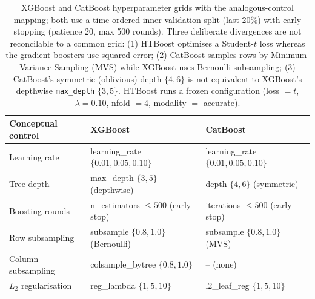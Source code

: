 \begin{table}[htbp]
\centering
\caption{XGBoost and CatBoost hyperparameter grids with the analogous-control mapping; both use a time-ordered inner-validation split (last 20\%) with early stopping (patience 20, max 500 rounds). Three deliberate divergences are not reconcilable to a common grid: (1) HTBoost optimises a Student-$t$ loss whereas the gradient-boosters use squared error; (2) CatBoost samples rows by Minimum-Variance Sampling (MVS) while XGBoost uses Bernoulli subsampling; (3) CatBoost's symmetric (oblivious) depth $\{4,6\}$ is not equivalent to XGBoost's depthwise \texttt{max\_depth} $\{3,5\}$. HTBoost runs a frozen configuration (loss $=t$, $\lambda=0.10$, nfold $=4$, modality $=$ accurate).}
\label{tab:app_grids}
\footnotesize
\begin{tabular}{lll}
\toprule
Conceptual control & XGBoost & CatBoost \\
\midrule
Learning rate & learning\_rate $\{0.01,0.05,0.10\}$ & learning\_rate $\{0.01,0.05,0.10\}$ \\
Tree depth & max\_depth $\{3,5\}$ (depthwise) & depth $\{4,6\}$ (symmetric) \\
Boosting rounds & n\_estimators $\le 500$ (early stop) & iterations $\le 500$ (early stop) \\
Row subsampling & subsample $\{0.8,1.0\}$ (Bernoulli) & subsample $\{0.8,1.0\}$ (MVS) \\
Column subsampling & colsample\_bytree $\{0.8,1.0\}$ & -- (none) \\
$L_2$ regularisation & reg\_lambda $\{1,5,10\}$ & l2\_leaf\_reg $\{1,5,10\}$ \\
\bottomrule
\end{tabular}
\end{table}
